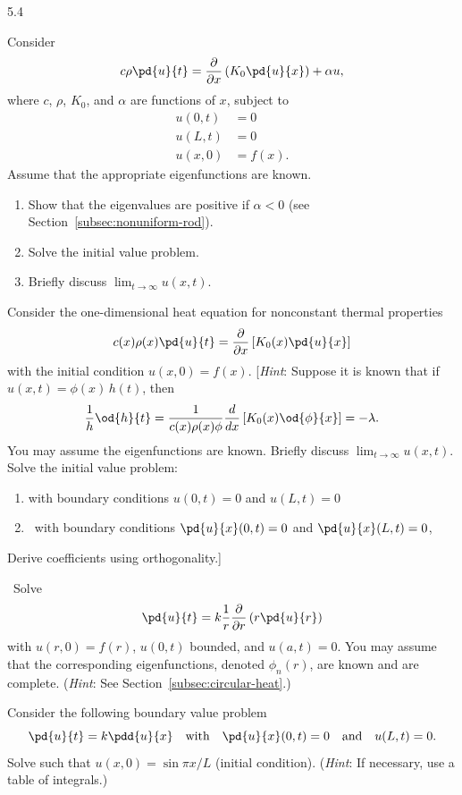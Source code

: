 \begin{exercises}{5.4}

\item Consider
\[
c\rho\pd{u}{t} = \frac{\partial}{\partial x}\left(K_0\pd{u}{x}\right) + \alpha u,
\]
where $c$, $\rho$, $K_0$, and $\alpha$ are functions of $x$, subject to
\begin{align*}
u(0,t) &= 0 \\
u(L,t) &= 0 \\
u(x,0) &= f(x).
\end{align*}
Assume that the appropriate eigenfunctions are known.
\begin{enumerate}
\item Show that the eigenvalues are positive if $\alpha < 0$ (see Section~\ref{subsec:nonuniform-rod}).
\item Solve the initial value problem.
\item Briefly discuss $\lim_{t\to\infty} u(x,t)$.
\end{enumerate}

\item Consider the one-dimensional heat equation for nonconstant thermal properties
\[
c(x)\rho(x)\pd{u}{t} = \frac{\partial}{\partial x}\left[K_0(x)\pd{u}{x}\right]
\]
with the initial condition $u(x,0) = f(x)$.  [\textit{Hint}: Suppose it is known that if $u(x,t) = \phi(x)\,h(t)$, then
\[
\frac{1}{h}\od{h}{t} = \frac{1}{c(x)\rho(x)\phi}\frac{d}{d x}\left[K_0(x)\od{\phi}{x}\right] = -\lambda.
\]
You may assume the eigenfunctions are known.  Briefly discuss $\lim_{t\to\infty} u(x,t)$.  Solve the initial value problem:
\begin{enumerate}
\item with boundary conditions $u(0,t) = 0$ and $u(L,t) = 0$
\item\starred\ with boundary conditions $\displaystyle\pd{u}{x}(0,t) = 0$ and $\displaystyle\pd{u}{x}(L,t) = 0$,
\end{enumerate}
Derive coefficients using orthogonality.]

\item\starred\ Solve
\[
\pd{u}{t} = k\frac{1}{r}\frac{\partial}{\partial r}\left(r\pd{u}{r}\right)
\]
with $u(r,0) = f(r)$, $u(0,t)$ bounded, and $u(a,t) = 0$.  You may assume that the corresponding eigenfunctions, denoted $\phi_n(r)$, are known and are complete.  (\textit{Hint}: See Section~\ref{subsec:circular-heat}.)

\item Consider the following boundary value problem
\[
\pd{u}{t} = k\pdd{u}{x} \quad \text{with} \quad \pd{u}{x}(0,t) = 0 \quad \text{and} \quad u(L,t) = 0.
\]
Solve such that $u(x,0) = \sin\pi x/L$ (initial condition).  (\textit{Hint}: If necessary, use a table of integrals.)


\end{exercises}
